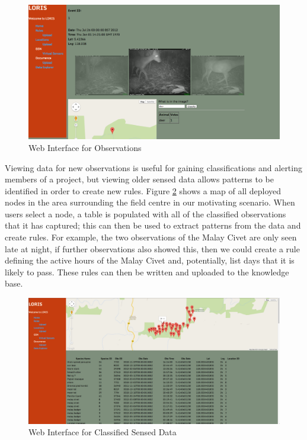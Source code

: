 		\begin{figure}[h]
		\centering
		\includegraphics[width=\textwidth]{Chap4/figures/loris}
		\caption{Web Interface for Observations}
		\label{kc:loris}
		\end{figure}
		
		Viewing data for new observations is useful for gaining classifications and alerting members of a project, but viewing older sensed data allows patterns to be identified in order to create new rules. Figure \ref{kc:loris_data} shows a map of all deployed nodes in the area surrounding the field centre in our motivating scenario. When users select a node, a table is populated with all of the classified observations that it has captured; this can then be used to extract patterns from the data and create rules. For example, the two observations of the Malay Civet are only seen late at night, if further observations also showed this, then we could create a rule defining the active hours of the Malay Civet and, potentially, list days that it is likely to pass. These rules can then be written and uploaded to the knowledge base.
		\begin{figure}[h]
		\centering
		\includegraphics[width=\textwidth]{Chap4/figures/loris_data}
		\caption{Web Interface for Classified Sensed Data}
		\label{kc:loris_data}
		\end{figure}

